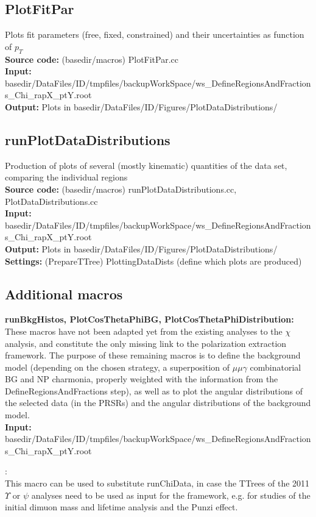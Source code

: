 \documentclass{article}
\begin{document}
\subsection{PlotFitPar}

Plots fit parameters (free, fixed, constrained) and their uncertainties as function of $p_T$
\\{\bf Source code:} (basedir/macros) PlotFitPar.cc
\\{\bf Input:} basedir/DataFiles/ID/tmpfiles/backupWorkSpace/ws\_DefineRegionsAndFractions\_Chi\_rapX\_ptY.root
\\{\bf Output:} Plots in basedir/DataFiles/ID/Figures/PlotDataDistributions/

\subsection{runPlotDataDistributions}

Production of plots of several (mostly kinematic) quantities of the data set, comparing the individual regions
\\{\bf Source code:} (basedir/macros) runPlotDataDistributions.cc, PlotDataDistributions.cc
\\{\bf Input:} basedir/DataFiles/ID/tmpfiles/backupWorkSpace/ws\_DefineRegionsAndFractions\_Chi\_rapX\_ptY.root
\\{\bf Output:} Plots in basedir/DataFiles/ID/Figures/PlotDataDistributions/
\\{\bf Settings:} (PrepareTTree)  PlottingDataDists (define which plots are produced)

\subsection{Additional macros}

{\bf runBkgHistos, PlotCosThetaPhiBG, PlotCosThetaPhiDistribution:}
\\These macros have not been adapted yet from the existing analyses to the $\chi$ analysis, and constitute the only missing link to the polarization extraction framework. The purpose of these remaining macros is to define the background model (depending on the chosen strategy, a superposition of $\mu\mu\gamma$ combinatorial BG and NP charmonia, properly weighted with the information from the DefineRegionsAndFractions step), as well as to plot the angular distributions of the selected data (in the PRSRs) and the angular distributions of the background model.
\\{\bf Input:} basedir/DataFiles/ID/tmpfiles/backupWorkSpace/ws\_DefineRegionsAndFractions\_Chi\_rapX\_ptY.root

\vspace*{15pt}
:
\\This macro can be used to substitute runChiData, in case the TTrees of the 2011 $\Upsilon$ or $\psi$ analyses need to be used as input for the framework, e.g. for studies of the initial dimuon mass and lifetime analysis and the Punzi effect.
\end{document}
